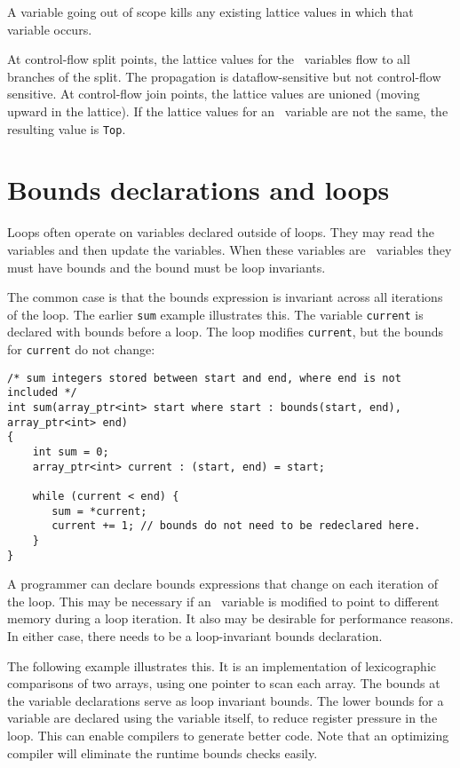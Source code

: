 A variable going out of scope kills any existing lattice values in which
that variable occurs.

At control-flow split points, the lattice values for the
\arrayptr\ variables flow to all branches of the split. The
propagation is dataflow-sensitive but not control-flow sensitive. At
control-flow join points, the lattice values are unioned (moving upward
in the lattice). If the lattice values for an \arrayptr\
variable are not the same, the resulting value is \texttt{Top}.

\section{Bounds declarations and loops}

Loops often operate on variables declared outside of loops. They may
read the variables and then update the variables. When these variables
are \arrayptr\ variables they must have bounds and the bound
must be loop invariants.

The common case is that the bounds expression is invariant across all
iterations of the loop. The earlier \texttt{sum} example illustrates
this. The variable \texttt{current} is declared with bounds before a
loop. The loop modifies \texttt{current}, but the bounds for
\texttt{current} do not change:

\begin{verbatim}
/* sum integers stored between start and end, where end is not included */
int sum(array_ptr<int> start where start : bounds(start, end), array_ptr<int> end)
{ 
    int sum = 0;
    array_ptr<int> current : (start, end) = start;

    while (current < end) {
       sum = *current;
       current += 1; // bounds do not need to be redeclared here.
    }
}
\end{verbatim}

A programmer can declare bounds expressions that change on each
iteration of the loop. This may be necessary if an \arrayptr\
variable is modified to point to different memory during a loop
iteration. It also may be desirable for performance reasons. In either
case, there needs to be a loop-invariant bounds declaration.

The following example illustrates this. It is an implementation of
lexicographic comparisons of two arrays, using one pointer to scan each
array. The bounds at the variable declarations serve as loop invariant
bounds. The lower bounds for a variable are declared using the variable
itself, to reduce register pressure in the loop. This can enable
compilers to generate better code. Note that an optimizing compiler will
eliminate the runtime bounds checks easily.

